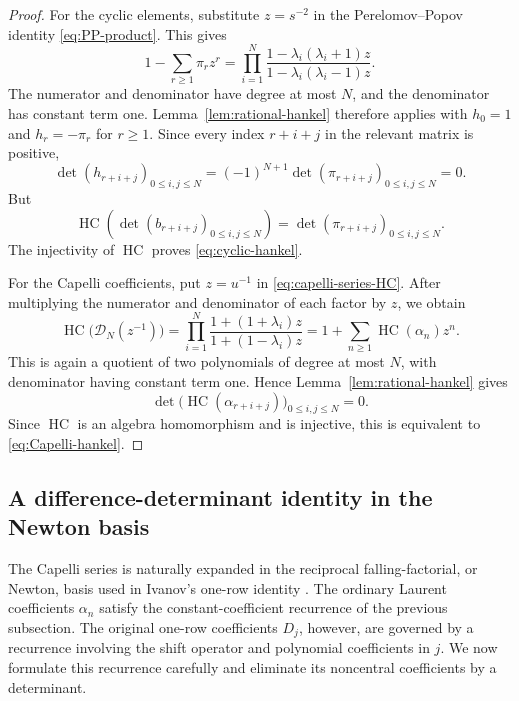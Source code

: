 \documentclass[11pt]{amsart}
\numberwithin{equation}{section}
\theoremstyle{definition}
\theoremstyle{remark}
\newcommand{\HC}{\operatorname{HC}}
\newcommand{\calD}{\mathcal D}
\begin{document}
\begin{proof}
For the cyclic elements, substitute \(z=s^{-2}\) in the
Perelomov--Popov identity \eqref{eq:PP-product}.  This gives
\begin{equation}
 1-\sum_{r\geq1}\pi_rz^r
 =\prod_{i=1}^{N}
 \frac{1-\lambda_i(\lambda_i+1)z}
      {1-\lambda_i(\lambda_i-1)z}.
 \label{eq:hankel-PP-product}
\end{equation}
The numerator and denominator have degree at most \(N\), and the
denominator has constant term one.  Lemma~\ref{lem:rational-hankel}
therefore applies with \(h_0=1\) and \(h_r=-\pi_r\) for \(r\geq1\).
Since every index \(r+i+j\) in the relevant matrix is positive,
\[
 \det(h_{r+i+j})_{0\leq i,j\leq N}
 =(-1)^{N+1}
  \det(\pi_{r+i+j})_{0\leq i,j\leq N}=0.
\]
But
\[
 \HC\!\left(
  \det(b_{r+i+j})_{0\leq i,j\leq N}
 \right)
 =\det(\pi_{r+i+j})_{0\leq i,j\leq N}.
\]
The injectivity of \(\HC\) proves \eqref{eq:cyclic-hankel}.

For the Capelli coefficients, put \(z=u^{-1}\) in
\eqref{eq:capelli-series-HC}.  After multiplying the numerator and
denominator of each factor by \(z\), we obtain
\begin{equation}
 \HC\bigl(\calD_N(z^{-1})\bigr)
 =\prod_{i=1}^{N}
   \frac{1+(1+\lambda_i)z}{1+(1-\lambda_i)z}
 =1+\sum_{n\geq1}\HC(\alpha_n)z^n.
 \label{eq:Capelli-rational-z}
\end{equation}
This is again a quotient of two polynomials of degree at most \(N\),
with denominator having constant term one.  Hence
Lemma~\ref{lem:rational-hankel} gives
\[
 \det\bigl(\HC(\alpha_{r+i+j})\bigr)_{0\leq i,j\leq N}=0.
\]
Since \(\HC\) is an algebra homomorphism and is injective, this is
equivalent to \eqref{eq:Capelli-hankel}.
\end{proof}

\subsection{A difference-determinant identity in the Newton basis}

The Capelli series is naturally expanded in the reciprocal
falling-factorial, or Newton, basis used in Ivanov's one-row identity
\cite[Sec.~8]{Ivanov2005}.  The ordinary Laurent coefficients
\(\alpha_n\) satisfy the constant-coefficient recurrence of the previous
subsection.  The original one-row coefficients \(D_j\), however, are
governed by a recurrence involving the shift operator and polynomial
coefficients in \(j\).  We now formulate this recurrence carefully and
eliminate its noncentral coefficients by a determinant.
\end{document}
